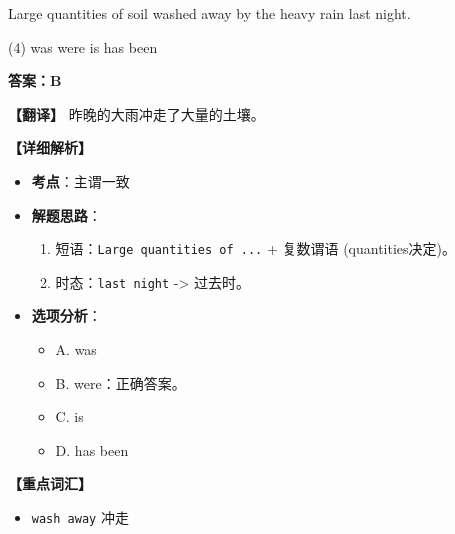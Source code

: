 \documentclass[11pt, a4paper]{article}
\newcommand{\analysis}[4]{
    \begin{solutionbox}
        \textbf{答案：#1}
        
        \textbf{【翻译】} #2
        
        \textbf{【详细解析】}
        #3
        
        \textbf{【重点词汇】}
        #4
    \end{solutionbox}
}
\newcommand{\blank}{\underline{\hspace{1.5cm}}}
\begin{document}
\begin{questions}
    \item Large quantities of soil \blank washed away by the heavy rain last night.
    \begin{tasks}(4)
        \task was \task were \task is \task has been
    \end{tasks}
    \analysis{B}{昨晚的大雨冲走了大量的土壤。}{
        \begin{itemize}
            \item \textbf{考点}：主谓一致
            \item \textbf{解题思路}：
                \begin{enumerate}
                    \item 短语：\texttt{Large quantities of ...} + 复数谓语 (quantities决定)。
                    \item 时态：\texttt{last night} -> 过去时。
                \end{enumerate}
            \item \textbf{选项分析}：
                \begin{itemize}
                    \item A. was
                    \item B. were：正确答案。
                    \item C. is
                    \item D. has been
                \end{itemize}
        \end{itemize}
    }{
        \begin{itemize}
            \item \texttt{wash away} 冲走
        \end{itemize}
    }


\end{questions}
\end{document}
